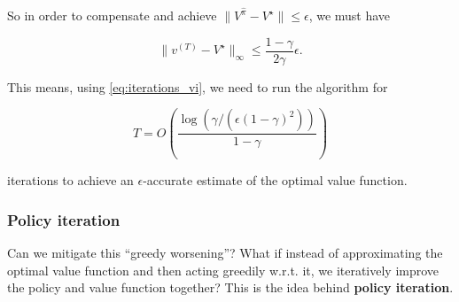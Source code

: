 \documentclass[../main/main]{subfiles}
\begin{document}
So in order to compensate and achieve $\|V^{\hat \pi} - V^{\star}\| \le \epsilon$, we must have

\[
    \|v^{(T)} - V^\star\|_{\infty} \le \frac{1-\gamma}{2 \gamma} \epsilon.
\]

This means, using \ref{eq:iterations_vi}, we need to run the algorithm for

\[
    T = O\left( \frac{\log(\gamma/(\epsilon (1-\gamma)^2))}{1-\gamma} \right)
\]

iterations to achieve an $\epsilon$-accurate estimate of the optimal value function.

\subsubsection{Policy iteration}

Can we mitigate this ``greedy worsening''? What if instead of approximating the optimal value function and then acting greedily w.r.t. it, we iteratively improve the policy and value function together? This is the idea behind \textbf{policy iteration}.
\end{document}
